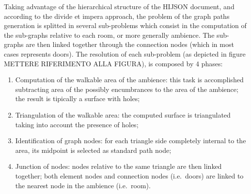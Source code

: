 Taking advantage of the hierarchical structure of the HIJSON document,
and according to the divide et impera approach, the problem of the graph
paths generation is splitted in several sub-problems which consist in
the computation of the sub-graphs relative to each room, or more
generally ambience. The sub-graphs are then linked together through the
connection nodes (which in most cases represents doors). The resolution
of each sub-problem (as depicted in figure METTERE RIFERIMENTO ALLA
FIGURA), is composed by 4 phases:

\begin{enumerate}
\def\labelenumi{\arabic{enumi}.}
\itemsep1pt\parskip0pt
\item
 Computation of the walkable area of the ambience: this task is
 accomplished subtracting area of the possibly encumbrances to the area
 of the ambience; the result is tipically a surface with holes;
\item
 Triangulation of the walkable area: the computed surface is
 triangulated taking into account the presence of holes;
\item
 Identification of graph nodes: for each triangle side completely
 internal to the area, its midpoint is selected as standard path node;
\item
 Junction of nodes: nodes relative to the same triangle are then linked
 together; both element nodes and connection nodes (i.e.~doors) are
 linked to the nearest node in the ambience (i.e.~room).
\end{enumerate}

